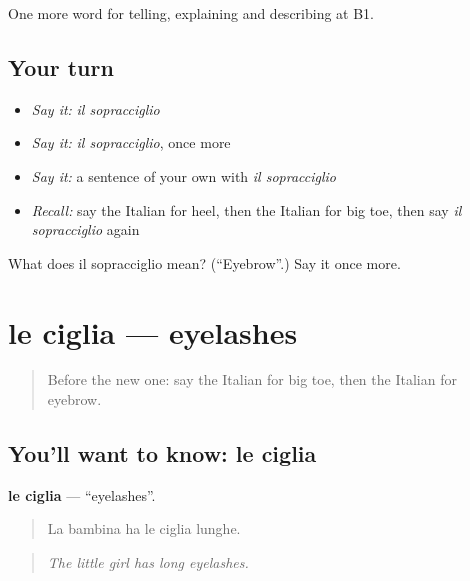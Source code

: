 \begin{grammarlens}[title={What you've built}]
One more word for telling, explaining and describing at B1.
\end{grammarlens}

\subsection*{Your turn}
\begin{itemize}
\raggedright
  \item \emph{Say it:} \emph{il sopracciglio}
  \item \emph{Say it:} \emph{il sopracciglio}, once more
  \item \emph{Say it:} a sentence of your own with \emph{il sopracciglio}
  \item \emph{Recall:} say the Italian for heel, then the Italian for big toe, then say \emph{il sopracciglio} again
\end{itemize}

\begin{tcolorbox}[breakable,colback=teal!4,colframe=teal!35!black,title={Before you move on}]
What does il sopracciglio mean? (\textquotedblleft{}Eyebrow\textquotedblright{}.) Say it once more.
\end{tcolorbox}
\section[le ciglia]{le ciglia — eyelashes}

\label{lesson:IT-C482-ciglia}



\begin{quote}
Before the new one: say the Italian for big toe, then the Italian for eyebrow.
\end{quote}

\subsection*{You'll want to know: le ciglia}
\textbf{le ciglia} — \textquotedblleft{}eyelashes\textquotedblright{}.

\begin{quote}
La bambina ha le ciglia lunghe.
\end{quote}

\begin{quote}
\emph{The little girl has long eyelashes.}
\end{quote}

